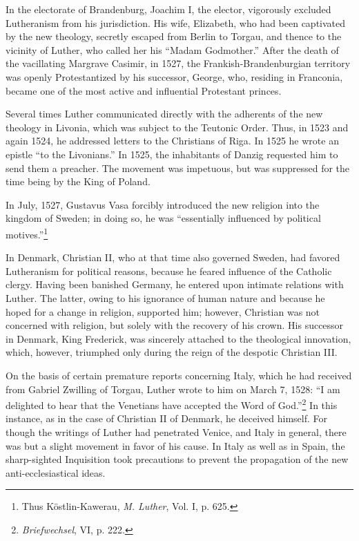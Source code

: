 In the electorate of Brandenburg, Joachim I, the elector, vigorously
excluded Lutheranism from his jurisdiction. His wife, Elizabeth, who
had been captivated by the new theology, secretly escaped from Berlin to
Torgau, and thence to the vicinity of Luther, who called her his
“Madam Godmother.” After the death of the vacillating Margrave
Casimir, in 1527, the Frankish-Brandenburgian territory was openly
Protestantized by his successor, George, who, residing in Franconia,
became one of the most active and influential Protestant princes.

Several times Luther communicated directly with the adherents
of the new theology in Livonia, which was subject to the Teutonic
Order. Thus, in 1523 and again 1524, he addressed letters to the
Christians of Riga. In 1525 he wrote an epistle “to the Livonians.”
In 1525, the inhabitants of Danzig requested him to send them a
preacher. The movement was impetuous, but was suppressed for the
time being by the King of Poland.

In July, 1527, Gustavus Vasa forcibly introduced the new religion
into the kingdom of Sweden; in doing so, he was “essentially influenced
by political motives.”\footnote{Thus Köstlin-Kawerau, \textit{M. Luther}, Vol. I, p. 625.}

In Denmark, Christian II, who at that time also governed Sweden,
had favored Lutheranism for political reasons, because he feared
influence of the Catholic clergy. Having been banished Germany,
he entered upon intimate relations with Luther. The latter, owing to
his ignorance of human nature and because he hoped for a change
in religion, supported him; however, Christian was not concerned
with religion, but solely with the recovery of his crown. His successor
in Denmark, King Frederick, was sincerely attached to the theological
innovation, which, however, triumphed only during the reign of the
despotic Christian III.

On the basis of certain premature reports concerning Italy, which
he had received from Gabriel Zwilling of Torgau, Luther wrote to
him on March 7, 1528: “I am delighted to hear that the Venetians
have accepted the Word of God.”\footnote{\textit{Briefwechsel}, VI, p. 222.}
In this instance, as in the case
of Christian II of Denmark, he deceived himself. For though the
writings of Luther had penetrated Venice, and Italy in general, there
was but a slight movement in favor of his cause. In Italy as well as in
Spain, the sharp-sighted Inquisition took precautions to prevent the
propagation of the new anti-ecclesiastical ideas.
